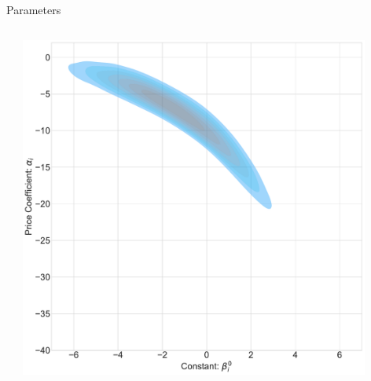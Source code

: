 \begin{frame}{Parameters}
\begin{columns}
\begin{column}{0.4\textwidth}
\scalebox{0.33}{

}
\end{column}
\begin{column}{0.6\textwidth}
\includegraphics[width=0.9\textwidth]{../common ownership/resources/2d_density_plot.pdf}
\end{column}
\end{columns}
\end{frame}



